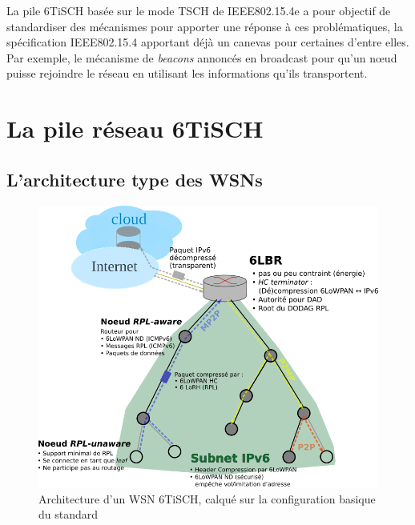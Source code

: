 \documentclass[]{report}
\begin{document}
\vspace{0.5cm}

\par La pile 6TiSCH basée sur le mode TSCH de IEEE802.15.4e a pour objectif de standardiser des mécanismes pour apporter une réponse à ces problématiques, la spécification IEEE802.15.4 apportant déjà un canevas pour certaines d'entre elles. Par exemple, le mécanisme de \textit{beacons} annoncés en broadcast pour qu'un nœud puisse rejoindre le réseau en utilisant les informations qu'ils transportent.

\newpage

\chapter{La pile réseau 6TiSCH}
\newpage
\section{L'architecture type des WSNs}
\label{archWSN}

	\begin{figure}[!ht]
	\centering
	\includegraphics[width=0.9\linewidth]{6TiSCH_arch}
	\caption{Architecture d'un WSN 6TiSCH, calqué sur la configuration basique du standard \cite{ietf-6tisch-architecture-28}}
	\label{fig:archWSN}
	\end{figure}

\vspace{0.2cm}
\end{document}
